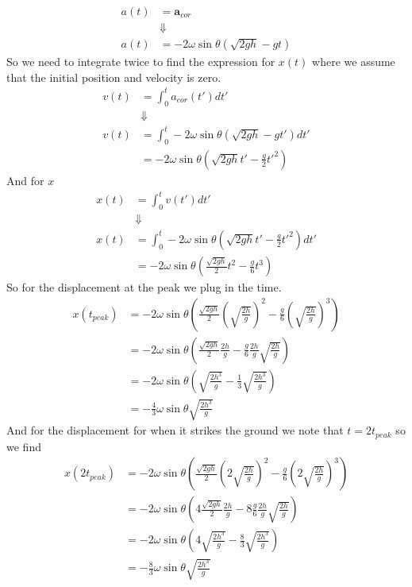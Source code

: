 \documentclass[11pt]{article}
\numberwithin{equation}{section}
\begin{document}
\begin{align*}
a(t) &= \mathbf{a}_{cor}\\
&\Downarrow\\
a(t) &= -2\omega\sin\theta\left(\sqrt{2gh}-gt\right)
\end{align*}
So we need to integrate twice to find the expression for $x(t)$ where we assume that the 
initial position and velocity is zero.
\begin{align*}
v(t) &= \int_{0}^{t}a_{cor}(t')dt'\\
&\Downarrow\\
v(t) &= \int_{0}^{t}-2\omega\sin\theta\left(\sqrt{2gh}-gt'\right)dt'\\
&= -2\omega\sin\theta\left(\sqrt{2gh}t'-\frac{g}{2}t'^2\right)
\end{align*}
And for $x$
\begin{align*}
x(t) &= \int_{0}^{t}v(t')dt'\\
&\Downarrow\\
x(t) &= \int_{0}^{t}-2\omega\sin\theta\left(\sqrt{2gh}t'-\frac{g}{2}t'^2\right)dt'\\
&= -2\omega\sin\theta\left(\frac{\sqrt{2gh}}{2}t^2-\frac{g}{6}t^3\right)
\end{align*}
So for the displacement at the peak we plug in the time.
\begin{align*}
x(t_{peak}) &= -2\omega\sin\theta\left(\frac{\sqrt{2gh}}{2}\left(\sqrt{\frac{2h}{g}}\right)^2-\frac{g}{6}\left(\sqrt{\frac{2h}{g}}\right)^3\right)\\
&= -2\omega\sin\theta\left(\frac{\sqrt{2gh}}{2}\frac{2h}{g}-\frac{g}{6}\frac{2h}{g}\sqrt{\frac{2h}{g}}\right)\\
&= -2\omega\sin\theta\left(\sqrt{\frac{2h^3}{g}}-\frac{1}{3}\sqrt{\frac{2h^3}{g}}\right)\\
&= -\frac{4}{3}\omega\sin\theta\sqrt{\frac{2h^3}{g}}
\end{align*}
And for the displacement for when it strikes the ground we note that $t=2t_{peak}$ so we 
find
\begin{align*}
x(2t_{peak}) &= -2\omega\sin\theta\left(\frac{\sqrt{2gh}}{2}\left(2\sqrt{\frac{2h}{g}}\right)^2-\frac{g}{6}\left(2\sqrt{\frac{2h}{g}}\right)^3\right)\\
&= -2\omega\sin\theta\left(4\frac{\sqrt{2gh}}{2}\frac{2h}{g}-8\frac{g}{6}\frac{2h}{g}\sqrt{\frac{2h}{g}}\right)\\
&= -2\omega\sin\theta\left(4\sqrt{\frac{2h^3}{g}}-\frac{8}{3}\sqrt{\frac{2h^3}{g}}\right)\\
&= -\frac{8}{3}\omega\sin\theta\sqrt{\frac{2h^3}{g}}
\end{align*}
\end{document}
